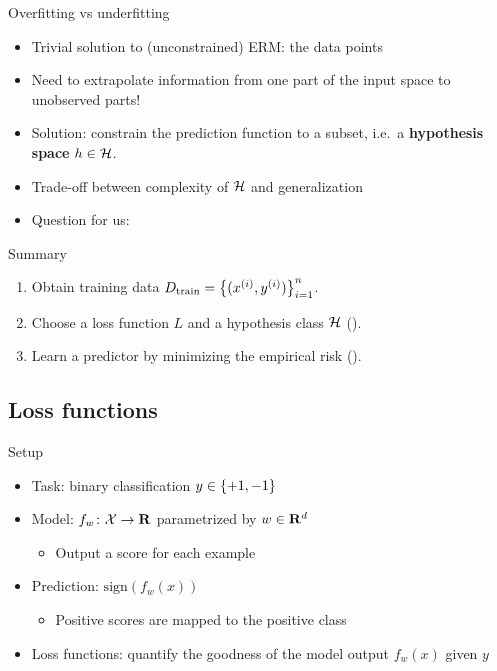 \documentclass[usenames,dvipsnames,notes,11pt,aspectratio=169]{beamer}
\begin{document}

\begin{frame}
    {Overfitting vs underfitting}
    \begin{itemize}
        \item Trivial solution to (unconstrained) ERM:  the data points
        \item Need to extrapolate information from one part of the input space to unobserved parts!
        \item Solution: constrain the prediction function to a subset, i.e.\ a \textbf{hypothesis space} $h\in \mathcal{H}$.
            \pause
        \item Trade-off between complexity of $\mathcal{H}$ and generalization 
        \item Question for us: 
    \end{itemize}
\end{frame}

\begin{frame}
    {Summary}
    \begin{enumerate}
        \itemsep2em
        \item Obtain training data $D_{\text{train}}=\left\{ (x^{(i)}, y^{(i)}) \right\}_{i=1}^n$.
        \item Choose a loss function $L$ and a hypothesis class $\mathcal{H}$ ().
        \item Learn a predictor by minimizing the empirical risk ().
    \end{enumerate}
\end{frame}

\subsection{Loss functions}

\begin{frame}
    {Setup}
    \begin{itemize}
        \itemsep1em
        \item Task: binary classification $y\in\left\{ +1, -1 \right\}$
        \item Model: $f_w\colon \mathcal{X} \rightarrow \mathbf{R}$ parametrized by $w \in \mathbf{R}^d$
            \begin{itemize}
                \item Output a score for each example
            \end{itemize}
        \item Prediction: $\text{sign}(f_w(x))$
            \begin{itemize}
                \item Positive scores are mapped to the positive class 
            \end{itemize}
        \item Loss functions: quantify the goodness of the model output $f_w(x)$ given $y$
    \end{itemize}
\end{frame}
\end{document}
